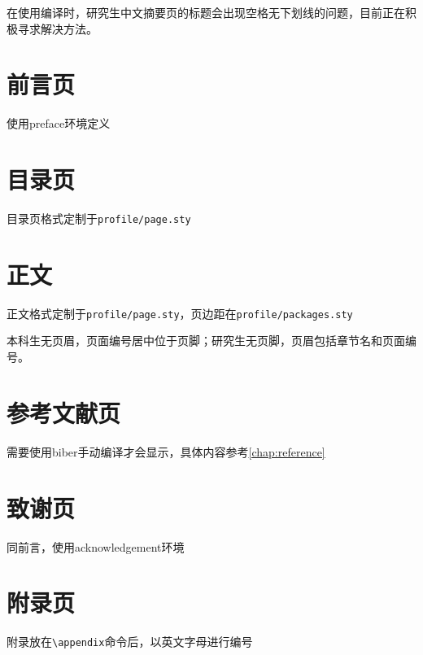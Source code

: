 在使用编译时，研究生中文摘要页的标题会出现空格无下划线的问题，目前正在积极寻求解决方法。

\section{前言页}

使用preface环境定义

\section{目录页}

目录页格式定制于\texttt{profile/page.sty}

\section{正文}

正文格式定制于\texttt{profile/page.sty}，页边距在\texttt{profile/packages.sty}

本科生无页眉，页面编号居中位于页脚；研究生无页脚，页眉包括章节名和页面编号。


\section{参考文献页}

需要使用biber手动编译才会显示，具体内容参考\cref{chap:reference}

\section{致谢页}

同前言，使用acknowledgement环境

\section{附录页}

附录放在\lstinline|\appendix|命令后，以英文字母进行编号
